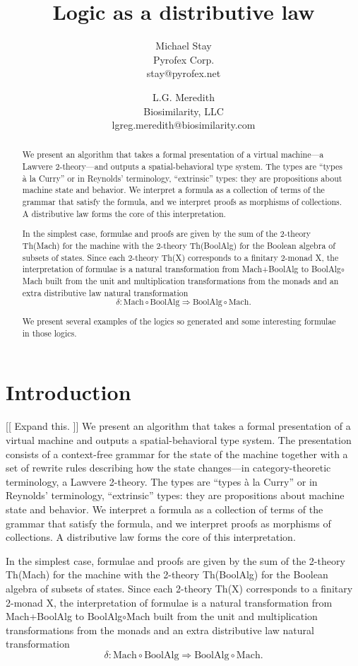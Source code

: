 \documentclass{article}
\title{Logic as a distributive law}
\author{
Michael Stay\\
  {Pyrofex Corp.}\\
  {\fontsize{8}{8}\selectfont stay@pyrofex.net}
\and
L.G. Meredith\\
  {Biosimilarity, LLC}\\
  {\fontsize{8}{8}\selectfont lgreg.meredith@biosimilarity.com}
}
\newcommand{\maps}{\colon}
\begin{document}
\maketitle
\begin{abstract}
\noindent
We present an algorithm that takes a formal presentation of a virtual machine---a Lawvere 2-theory---and outputs a spatial-behavioral type system.  The types are ``types \`a la Curry'' or in Reynolds' terminology, ``extrinsic'' types: they are propositions about machine state and behavior.  We interpret a formula as a collection of terms of the grammar that satisfy the formula, and we interpret proofs as morphisms of collections.  A distributive law forms the core of this interpretation.

In the simplest case, formulae and proofs are given by the sum of the 2-theory Th(Mach) for the machine with the 2-theory Th(BoolAlg) for the Boolean algebra of subsets of states.  Since each 2-theory Th(X) corresponds to a finitary 2-monad X, the interpretation of formulae is a natural transformation from Mach+BoolAlg to BoolAlg$\circ$Mach built from the unit and multiplication transformations from the monads and an extra distributive law natural transformation 
\[\delta\maps \mathrm{Mach}\circ\mathrm{BoolAlg} \Rightarrow \mathrm{BoolAlg}\circ\mathrm{Mach}.\]

We present several examples of the logics so generated and some interesting formulae in those logics.
\end{abstract}

\section{Introduction}
[[ Expand this. ]]
  We present an algorithm that takes a formal presentation of a virtual machine and outputs a spatial-behavioral type system.  The presentation consists of a context-free grammar for the state of the machine together with a set of rewrite rules describing how the state changes---in category-theoretic terminology, a Lawvere 2-theory.  The types are ``types \`a la Curry'' or in Reynolds' terminology, ``extrinsic'' types: they are propositions about machine state and behavior.  We interpret a formula as a collection of terms of the grammar that satisfy the formula, and we interpret proofs as morphisms of collections.  A distributive law forms the core of this interpretation.

  In the simplest case, formulae and proofs are given by the sum of the 2-theory Th(Mach) for the machine with the 2-theory Th(BoolAlg) for the Boolean algebra of subsets of states.  Since each 2-theory Th(X) corresponds to a finitary 2-monad X, the interpretation of formulae is a natural transformation from Mach+BoolAlg to BoolAlg$\circ$Mach built from the unit and multiplication transformations from the monads and an extra distributive law natural transformation 
  \[\delta\maps \mathrm{Mach}\circ\mathrm{BoolAlg} \Rightarrow \mathrm{BoolAlg}\circ\mathrm{Mach}.\]
\end{document}
